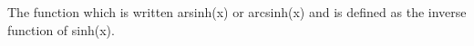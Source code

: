 The function which is written arsinh(x) or arcsinh(x) and is
defined as the inverse function of sinh(x).